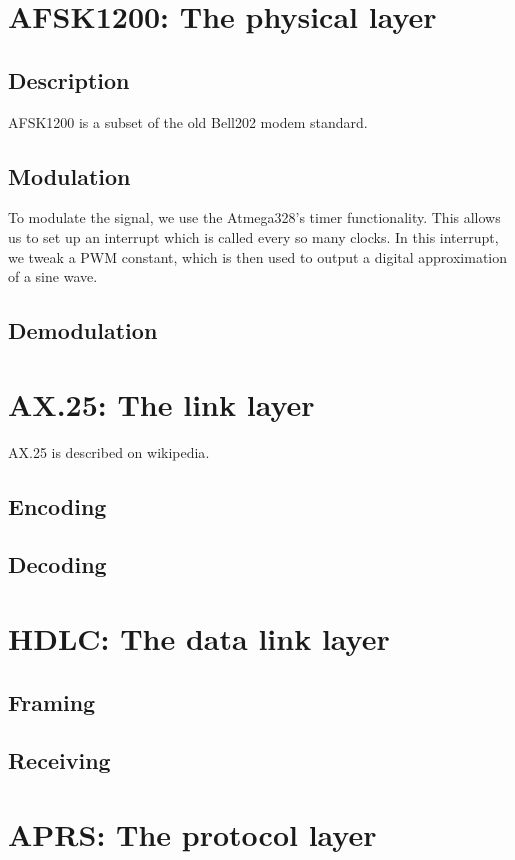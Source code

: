 \documentclass{article}
\begin{document}
\section{AFSK1200: The physical layer}

\subsection{Description}

AFSK1200 is a subset of the old Bell202 modem standard\cite{ruafsk1200}.

\subsection{Modulation}

To modulate the signal, we use the Atmega328's timer functionality.
This allows us to set up an interrupt which is called every so many
clocks.  In this interrupt, we tweak a PWM constant, which is then
used to output a digital approximation of a sine wave.


\subsection{Demodulation}

\section{AX.25: The link layer}

AX.25 is described on wikipedia\cite{WikiAX25}.

\subsection{Encoding}
\subsection{Decoding}



\section{HDLC: The data link layer}
\subsection{Framing}
\subsection{Receiving}

\section{APRS: The protocol layer}





\end{document}
